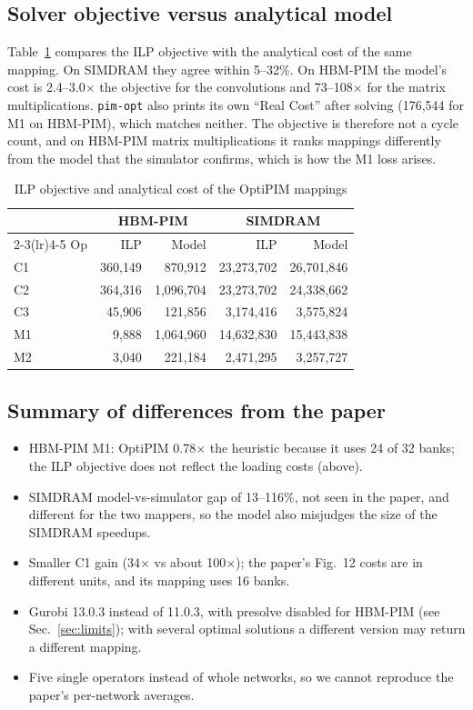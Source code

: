 \documentclass[conference]{IEEEtran}
\begin{document}
\subsection{Solver objective versus analytical model}
\label{sec:objcheck}
Table~\ref{tab:obj} compares the ILP objective with the analytical cost of the
same mapping. On SIMDRAM they agree within 5--32\%. On HBM-PIM the model's cost
is 2.4--3.0$\times$ the objective for the convolutions and 73--108$\times$ for
the matrix multiplications. \texttt{pim-opt} also prints its own ``Real Cost''
after solving (176{,}544 for M1 on HBM-PIM), which matches neither. The
objective is therefore not a cycle count, and on HBM-PIM matrix
multiplications it ranks mappings differently from the model that the
simulator confirms, which is how the M1 loss arises.

\begin{table}[t]
\centering
\caption{ILP objective and analytical cost of the OptiPIM mappings}
\label{tab:obj}
\footnotesize
\setlength{\tabcolsep}{4pt}
\begin{tabular}{lrrrr}
\toprule
 & \multicolumn{2}{c}{HBM-PIM} & \multicolumn{2}{c}{SIMDRAM} \\
\cmidrule(lr){2-3}\cmidrule(lr){4-5}
Op & ILP & Model & ILP & Model \\
\midrule
C1 & 360{,}149 & 870{,}912 & 23{,}273{,}702 & 26{,}701{,}846 \\
C2 & 364{,}316 & 1{,}096{,}704 & 23{,}273{,}702 & 24{,}338{,}662 \\
C3 & 45{,}906 & 121{,}856 & 3{,}174{,}416 & 3{,}575{,}824 \\
M1 & 9{,}888 & 1{,}064{,}960 & 14{,}632{,}830 & 15{,}443{,}838 \\
M2 & 3{,}040 & 221{,}184 & 2{,}471{,}295 & 3{,}257{,}727 \\
\bottomrule
\end{tabular}
\end{table}

\subsection{Summary of differences from the paper}
\begin{itemize}
\item HBM-PIM M1: OptiPIM 0.78$\times$ the heuristic because it uses 24 of 32
banks; the ILP objective does not reflect the loading costs (above).
\item SIMDRAM model-vs-simulator gap of 13--116\%, not seen in the paper, and
different for the two mappers, so the model also misjudges the size of the
SIMDRAM speedups.
\item Smaller C1 gain (34$\times$ vs about 100$\times$); the paper's Fig.~12
costs are in different units, and its mapping uses 16 banks.
\item Gurobi 13.0.3 instead of 11.0.3, with presolve disabled for HBM-PIM (see Sec.~\ref{sec:limits}); with several
optimal solutions a different version may return a different mapping.
\item Five single operators instead of whole networks, so we cannot reproduce
the paper's per-network averages.
\end{itemize}
\end{document}
